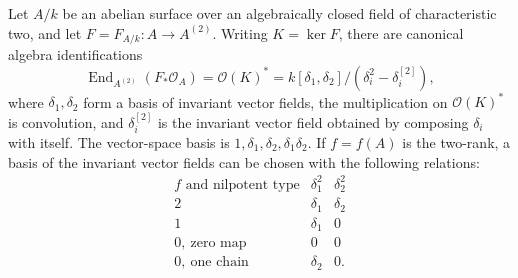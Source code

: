 \begin{lemma}
\label{lem:surface-frobenius-distributions}
Let $A/k$ be an abelian surface over an algebraically closed field of
characteristic two, and let $F=F_{A/k}:A\to A^{(2)}$.
Writing $K=\ker F$, there are canonical algebra identifications
\[
 \operatorname{End}_{A^{(2)}}(F_*\mathcal O_A)
       =\mathcal O(K)^*
       =k[\delta_1,\delta_2]/
          (\delta_i^2-\delta_i^{[2]}),
\]
where $\delta_1,\delta_2$ form a basis of invariant vector fields,
the multiplication on $\mathcal O(K)^*$ is convolution, and
$\delta_i^{[2]}$ is the invariant vector field obtained by composing
$\delta_i$ with itself. The vector-space basis is
$1,\delta_1,\delta_2,\delta_1\delta_2$.
If $f=f(A)$ is the two-rank, a basis of the invariant vector fields
can be chosen with the following relations:
\[
\begin{array}{c|cc}
 f\text{ and nilpotent type}&\delta_1^2&\delta_2^2\\\hline
 2&\delta_1&\delta_2\\
 1&\delta_1&0\\
 0,\ \text{zero map}&0&0\\
 0,\ \text{one chain}&\delta_2&0.
\end{array}
\]
\end{lemma}
